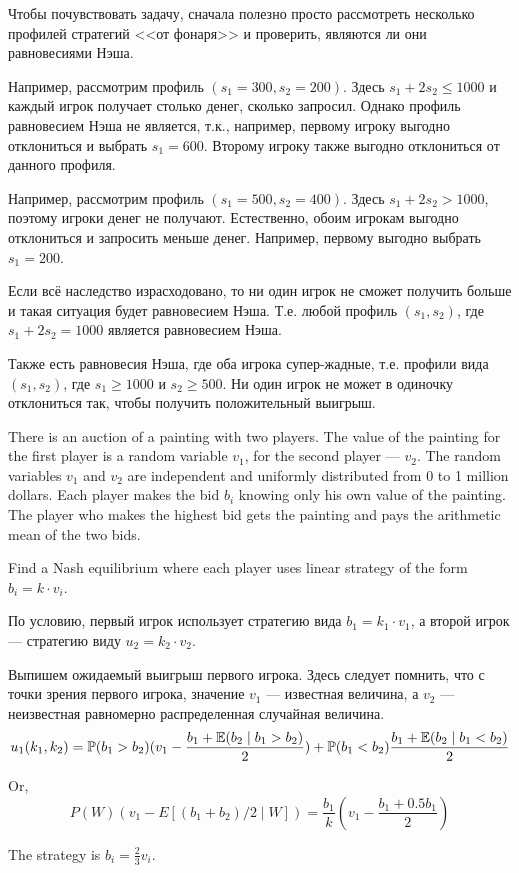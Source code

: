 \begin{solution}
Чтобы почувствовать задачу, сначала полезно просто рассмотреть несколько профилей стратегий <<от фонаря>> и проверить, являются ли они равновесиями Нэша.

Например, рассмотрим профиль $(s_1=300,s_2=200)$. Здесь $s_1+2s_2\leq 1000$ и каждый игрок получает столько денег, сколько запросил. Однако профиль  равновесием Нэша не является, т.к., например, первому игроку выгодно отклониться и выбрать $s_1=600$.  Второму игроку также выгодно отклониться от данного профиля.

Например, рассмотрим профиль $(s_1=500,s_2=400)$. Здесь $s_1+2s_2>1000$, поэтому игроки денег не получают. Естественно, обоим игрокам выгодно отклониться и запросить меньше денег. Например, первому выгодно выбрать $s_1=200$. 

Если всё наследство израсходовано, то ни один игрок не сможет получить больше и такая ситуация будет равновесием Нэша. Т.е. любой профиль $(s_1,s_2)$, где  $s_1+2s_2=1000$ является равновесием Нэша.

Также есть равновесия Нэша, где оба игрока супер-жадные, т.е. профили вида $(s_1,s_2)$, где $s_1\geq 1000$ и $s_2 \geq 500$. Ни один игрок не может в одиночку отклониться так, чтобы получить положительный выигрыш.
\end{solution}

\begin{problem}
There is an auction of a painting with two players. The value of the painting for the first player is a random variable $v_1$, for the second player --- $v_2$. The random variables $v_1$ and $v_2$ are independent and uniformly distributed from 0 to 1 million dollars. Each player makes the bid $b_i$ knowing only his own value of the painting. The player who makes the highest bid gets the painting and pays the arithmetic mean of the two bids. 

Find a Nash equilibrium where each player uses linear strategy of the form $b_i=k\cdot v_i$.
\end{problem}

\begin{solution}
По условию, первый игрок использует стратегию вида $b_1=k_1\cdot v_1$, а второй игрок --- стратегию виду $u_2=k_2\cdot v_2$. 

Выпишем ожидаемый выигрыш первого игрока. Здесь следует помнить, что с точки зрения первого игрока, значение $v_1$ --- известная величина, а $v_2$ --- неизвестная равномерно распределенная случайная величина.
\[
u_1(k_1,k_2)=\mathbb{P}(b_1>b_2)(v_1- \frac{b_1+\mathbb{E}(b_2\mid b_1>b_2)}{2}) + \mathbb{P}(b_1<b_2) \frac{b_1+\mathbb{E}(b_2\mid b_1< b_2)}{2}
\]

Or,
\[
P(W) \left( v_1 - E[(b_1+b_2)/2 \mid W] \right) = \frac{b_1}{k} \left( v_1 - \frac{b_1+0.5b_1}{2}\right)
\]

The strategy is $b_i=\frac{2}{3}v_i$.

\end{solution}

